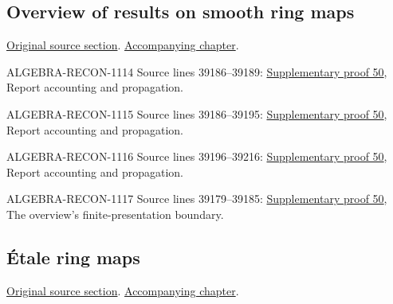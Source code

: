 \subsection{Overview of results on smooth ring maps}
\hypertarget{algebra-source-section-smooth-overview}{}
\noindent\href{https://github.com/stacks/stacks-project/blob/a04446e57ec1fbc252a871afcec7752fb2807b14/algebra.tex\#L39148}{Original source section}. \href{algebra.pdf\#nameddest=section-smooth-overview}{Accompanying chapter}.

\begin{AlgebraSourceRoutes}
\item[ALGEBRA-RECON-1114] Source lines 39186--39189: \hyperlink{algebra_smooth_artin_notes_20260928}{Supplementary proof 50}, Report accounting and propagation.
\item[ALGEBRA-RECON-1115] Source lines 39186--39195: \hyperlink{algebra_smooth_artin_notes_20260928}{Supplementary proof 50}, Report accounting and propagation.
\item[ALGEBRA-RECON-1116] Source lines 39196--39216: \hyperlink{algebra_smooth_artin_notes_20260928}{Supplementary proof 50}, Report accounting and propagation.
\item[ALGEBRA-RECON-1117] Source lines 39179--39185: \hyperlink{algebra_smooth_artin_notes_20260928}{Supplementary proof 50}, The overview's finite-presentation boundary.
\end{AlgebraSourceRoutes}

\subsection{\'Etale ring maps}
\hypertarget{algebra-source-section-etale}{}
\noindent\href{https://github.com/stacks/stacks-project/blob/a04446e57ec1fbc252a871afcec7752fb2807b14/algebra.tex\#L39236}{Original source section}. \href{algebra.pdf\#nameddest=section-etale}{Accompanying chapter}.

